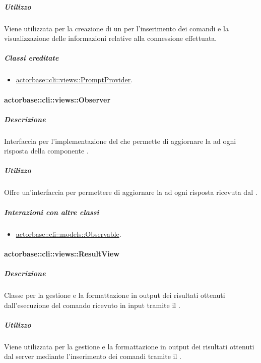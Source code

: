 \documentclass{scalatekids-article}
\begin{document}
\subparagraph{Utilizzo}

Viene utilizzata per la creazione di un  per l'inserimento dei
comandi e la visualizzazione delle informazioni relative alla connessione
effettuata. %

\subparagraph{Classi ereditate}

\begin{itemize}
\item \hyperref[sec:actorbase::cli::views::PromptProvider]{actorbase::cli::views::PromptProvider}.
\end{itemize}

\paragraph{actorbase::cli::views::Observer}
\label{sec:actorbase::cli::views::Observer}

\subparagraph{Descrizione}

Interfaccia per l'implementazione del  
che permette di aggiornare la  ad ogni risposta della componente
.

\subparagraph{Utilizzo}

Offre un'interfaccia per permettere di aggiornare la  ad ogni
risposta ricevuta dal .

\subparagraph{Interazioni con altre classi}

\begin{itemize}
\item \hyperref[sec:actorbase::cli::models::Observable]{actorbase::cli::models::Observable}.
\end{itemize}

\paragraph{actorbase::cli::views::ResultView}
\label{sec:actorbase::cli::views::ResultView}

\subparagraph{Descrizione}

Classe per la gestione e la formattazione in output dei risultati ottenuti
dall'esecuzione del comando ricevuto in input tramite il  .

\subparagraph{Utilizzo}

Viene utilizzata per la gestione e la formattazione in output dei risultati
ottenuti dal server mediante l'inserimento dei comandi tramite il
 .
\end{document}
